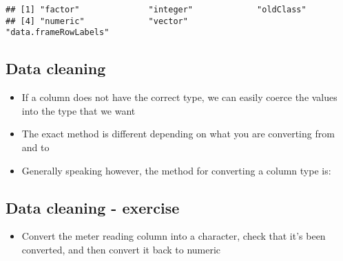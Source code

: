 \documentclass[]{article}
\newenvironment{Shaded}{\begin{snugshade}}{\end{snugshade}}
\newcommand{\KeywordTok}[1]{\textcolor[rgb]{0.13,0.29,0.53}{\textbf{#1}}}
\newcommand{\StringTok}[1]{\textcolor[rgb]{0.31,0.60,0.02}{#1}}
\newcommand{\OperatorTok}[1]{\textcolor[rgb]{0.81,0.36,0.00}{\textbf{#1}}}
\newcommand{\NormalTok}[1]{#1}
\providecommand{\tightlist}{%
  \setlength{\itemsep}{0pt}\setlength{\parskip}{0pt}}
\begin{document}
\begin{verbatim}
## [1] "factor"              "integer"             "oldClass"           
## [4] "numeric"             "vector"              "data.frameRowLabels"
\end{verbatim}

\subsection{Data cleaning}\label{data-cleaning-3}

\begin{itemize}
\tightlist
\item
  If a column does not have the correct type, we can easily coerce the
  values into the type that we want
\item
  The exact method is different depending on what you are converting
  from and to
\item
  Generally speaking however, the method for converting a column type
  is:
\end{itemize}

\begin{Shaded}
\end{Shaded}

\subsection{Data cleaning - exercise}\label{data-cleaning---exercise}

\begin{itemize}
\tightlist
\item
  Convert the meter reading column into a character, check that it's
  been converted, and then convert it back to numeric
\end{itemize}

\begin{Shaded}
\end{Shaded}
\end{document}
